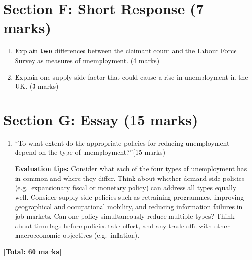 \documentclass[12pt,a4paper]{article}
\begin{document}
\newpage

\section*{Section F: Short Response (7 marks)}

\begin{enumerate}[leftmargin=*, label=\textbf{\arabic*.}]

    \item Explain \textbf{two} differences between the claimant count and the Labour Force Survey as measures of unemployment. \hfill (4 marks)\\[6.5cm]

    \item Explain one supply-side factor that could cause a rise in unemployment in the UK. \hfill (3 marks)\\[5.5cm]

\end{enumerate}

\newpage

\section*{Section G: Essay (15 marks)}

\begin{enumerate}[leftmargin=*, label=\textbf{\arabic*.}]

    \item \textquotedblleft To what extent do the appropriate policies for reducing unemployment depend on the type of unemployment?\textquotedblright \hfill (15 marks)

    \vspace{0.8em}

    \begin{keypoint}
        \textbf{Evaluation tips:} Consider what each of the four types of unemployment has in common and where they differ. Think about whether demand-side policies (e.g.\ expansionary fiscal or monetary policy) can address all types equally well. Consider supply-side policies such as retraining programmes, improving geographical and occupational mobility, and reducing information failures in job markets. Can one policy simultaneously reduce multiple types? Think about time lags before policies take effect, and any trade-offs with other macroeconomic objectives (e.g.\ inflation).
    \end{keypoint}

    \vspace{14cm}

\end{enumerate}

\vfill
\begin{center}
    \textbf{[Total: 60 marks]}
\end{center}
\end{document}
